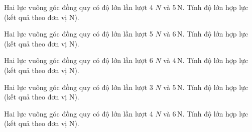 \begin{bt}
Hai lực vuông góc đồng quy có độ lớn lần lượt 4 $N$ và $5\,\text{N}$. Tính độ lớn hợp lực (kết quả theo đơn vị N).
\end{bt}

\begin{bt}
Hai lực vuông góc đồng quy có độ lớn lần lượt 5 $N$ và $6\,\text{N}$. Tính độ lớn hợp lực (kết quả theo đơn vị N).
\end{bt}

\begin{bt}
Hai lực vuông góc đồng quy có độ lớn lần lượt 6 $N$ và $4\,\text{N}$. Tính độ lớn hợp lực (kết quả theo đơn vị N).
\end{bt}

\begin{bt}
Hai lực vuông góc đồng quy có độ lớn lần lượt 3 $N$ và $5\,\text{N}$. Tính độ lớn hợp lực (kết quả theo đơn vị N).
\end{bt}

\begin{bt}
Hai lực vuông góc đồng quy có độ lớn lần lượt 4 $N$ và $6\,\text{N}$. Tính độ lớn hợp lực (kết quả theo đơn vị N).
\end{bt}

